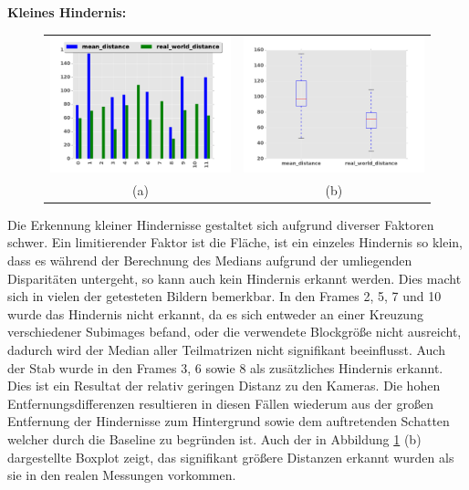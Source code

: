 \noindent
\textbf{Kleines Hindernis:}\\
\begin{figure}[h]
	\centering
	\begin{tabular}{cc}
	\includegraphics[width=7cm]{img/evaluation/diagrams/sub_tiny_bar}&
	\includegraphics[width=7cm]{img/evaluation/diagrams/sub_tiny_box}\\
	(a)	& (b)
	\end{tabular}
    \caption{}
    \label{fig:eval_tiny}
\end{figure}

\noindent
Die Erkennung kleiner Hindernisse gestaltet sich aufgrund diverser Faktoren schwer. Ein limitierender Faktor ist die Fläche, ist ein einzeles Hindernis so klein, dass es während der Berechnung des Medians aufgrund der umliegenden Disparitäten untergeht, so kann auch kein Hindernis erkannt werden. Dies macht sich in vielen der getesteten Bildern bemerkbar. In den Frames 2, 5, 7 und 10 wurde das Hindernis nicht erkannt, da es sich entweder an einer Kreuzung verschiedener Subimages befand, oder die verwendete Blockgröße nicht ausreicht, dadurch wird der Median aller Teilmatrizen nicht signifikant beeinflusst. Auch der Stab wurde in den Frames 3, 6 sowie 8 als zusätzliches Hindernis erkannt. Dies ist ein Resultat der relativ geringen Distanz zu den Kameras. Die hohen Entfernungsdifferenzen resultieren in diesen Fällen wiederum aus der großen Entfernung der Hindernisse zum Hintergrund sowie dem auftretenden Schatten welcher durch die Baseline zu begründen ist. Auch der in Abbildung \ref{fig:eval_tiny} (b) dargestellte Boxplot zeigt, das signifikant größere Distanzen erkannt wurden als sie in den realen Messungen vorkommen.

